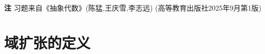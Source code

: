 \newenvironment{solution}{\begin{proof}[解]}{\end{proof}}

\textbf{注} \quad 习题来自《抽象代数》(陈猛,王庆雪,李志远) (高等教育出版社2025年9月第1版)

\section{域扩张的定义}

